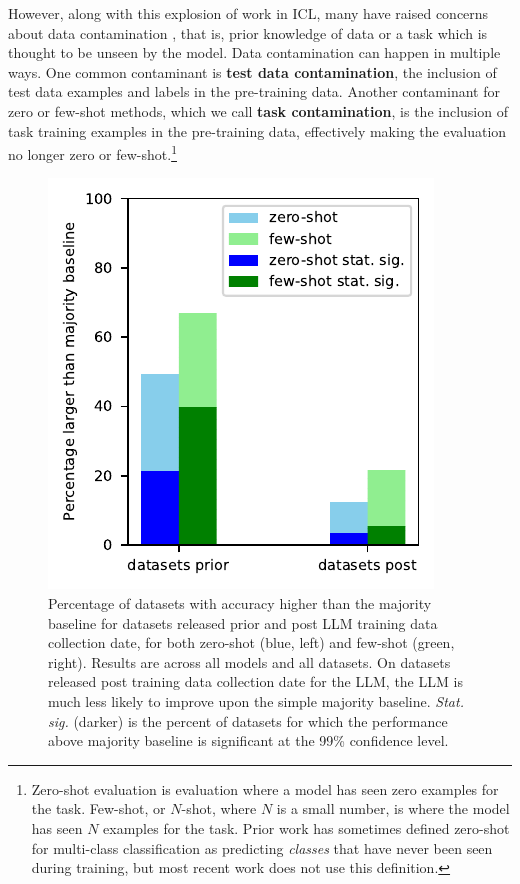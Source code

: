 \documentclass[letterpaper]{article} %
\newcommand{\jmf}[1]{}      %
\begin{document}
However, along with this explosion of work in ICL, many have raised concerns about data contamination \cite{brown2020, jacovi2023}, that is, prior knowledge of data or a task which is thought to be unseen by the model.\jmf{add citation to GPT paper that did data contamination analysis.}\jmf{define data contamination} Data contamination can happen in multiple ways. One common contaminant is \textbf{test data contamination}, the inclusion of test data examples and labels in the pre-training data. Another contaminant for zero or few-shot methods, which we call \textbf{task contamination}, is the inclusion of task training examples in the pre-training data, effectively making the evaluation no longer zero or few-shot.\footnote{Zero-shot evaluation is evaluation where a model has seen zero examples for the task.  Few-shot, or $N$-shot, where $N$ is a small number, is where the model has seen $N$ examples for the task. Prior work has sometimes defined zero-shot for multi-class classification as predicting \textit{classes} that have never been seen during training, but most recent work does not use this definition.}

\begin{figure}[t]
\centering
\includegraphics[scale=1]{img/all-dataset-percentage.pdf}
\caption{Percentage of datasets with accuracy higher than the majority baseline for datasets released prior and post LLM training data collection date, for both zero-shot (blue, left) and few-shot (green, right).  Results are across all models and all datasets. On datasets released post training data collection date for the LLM, the LLM is much less likely to improve upon the simple majority baseline. \textit{Stat. sig.} (darker) is the percent of datasets for which the performance above majority baseline is significant at the 99\% confidence level.}
\label{fig:baseline-percentage}
\end{figure}
\end{document}

